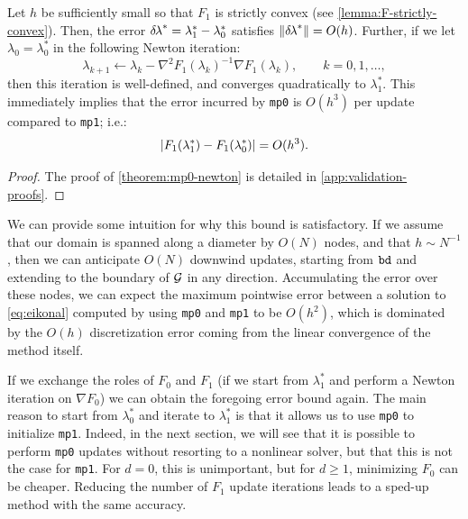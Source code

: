 \documentclass[sisc-eikonal.tex]{subfiles}
\begin{document}
\begin{theorem}\label{theorem:mp0-newton}
  Let $h$ be sufficiently small so that $F_1$ is strictly convex (see
  \cref{lemma:F-strictly-convex}). Then, the error
  ${\delta \hspace{-0.1em} \lambda}^* = \lambda_1^* - \lambda_0^*$ satisfies
  $\left\|{\delta \hspace{-0.1em} \lambda}^*\right\| = O(h)$. Further, if we let
  $\lambda_0 = \lambda_0^*$ in the following Newton iteration:
  \begin{equation}
    \label{eq:lam0-iter-to-lam1}
    \lambda_{k+1} \gets \lambda_k - \nabla^2 F_1(\lambda_k)^{-1} \nabla F_1(\lambda_k), \qquad k = 0, 1, \hdots,
  \end{equation}
  then this iteration is well-defined, and converges quadratically to
  $\lambda_1^*$. This immediately implies that the error incurred by
  \texttt{mp0} is $O(h^3)$ per update compared to \texttt{mp1}; i.e.:
  \begin{equation}
    \label{eq:mp0-error}
    \abs{F_1(\lambda_1^*) - F_1(\lambda_0^*)} = O(h^3).
  \end{equation}
\end{theorem}

\begin{proof}
  The proof of \cref{theorem:mp0-newton} is detailed in
  \cref{app:validation-proofs}.
\end{proof}

We can provide some intuition for why this bound is satisfactory. If
we assume that our domain is spanned along a diameter by $O(N)$ nodes,
and that $h \sim N^{-1}$, then we can anticipate $O(N)$ downwind
updates, starting from $\texttt{bd}$ and extending to the boundary of
$\mathcal{G}$ in any direction. Accumulating the error over these nodes, we
can expect the maximum pointwise error between a solution to
\cref{eq:eikonal} computed by using \texttt{mp0} and \texttt{mp1} to
be $O(h^2)$, which is dominated by the $O(h)$ discretization error
coming from the linear convergence of the method itself.

If we exchange the roles of $F_0$ and $F_1$ (if we start from
$\lambda_1^*$ and perform a Newton iteration on $\nabla F_0$) we can
obtain the foregoing error bound again. The main reason to start from
$\lambda_0^*$ and iterate to $\lambda_1^*$ is that it allows us to use
\texttt{mp0} to initialize \texttt{mp1}. Indeed, in the next section,
we will see that it is possible to perform \texttt{mp0} updates
without resorting to a nonlinear solver, but that this is not the case
for \texttt{mp1}. For $d = 0$, this is unimportant, but for
$d \geq 1$, minimizing $F_0$ can be cheaper. Reducing the number of
$F_1$ update iterations leads to a sped-up method with the same
accuracy.
\end{document}
